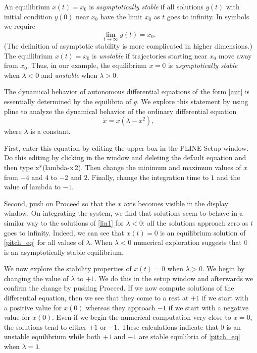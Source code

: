 \documentclass{ximera}
\begin{document}
An equilibrium $x(t)=x_0$ is {\em asymptotically stable\/}
 if all solutions $y(t)$ with
initial condition $y(0)$ near $x_0$ have the limit
$x_0$ as $t$ goes to infinity.  In symbols we require
\[
\lim_{t\to\infty} y(t) = x_0.
\]
(The definition of asymptotic stability is more complicated in
higher dimensions.) The equilibrium $x(t)=x_0$ is {\em unstable\/}
 if trajectories starting near $x_0$ move away
from $x_0$.  Thus, in
our example, the equilibrium $x=0$ is {\em asymptotically
stable\/} when $\lambda< 0$ and {\em unstable\/}
when $\lambda> 0$.

The dynamical behavior of autonomous differential equations of
the form \eqref{aut} is essentially determined by the equilibria
of $g$.  We explore this statement by using {\sf pline} to
analyze the dynamical behavior of the ordinary differential
equation
\begin{equation} \label{pitch_eq}
	\dot{x} = x(\lambda-x^2),
\end{equation}
where $\lambda$ is a constant.  

First, enter this equation by editing the upper box in the 
{\sf PLINE Setup} window.  Do this editing by clicking in 
the window and deleting the default equation and then type 
{\sf x*(lambda-x\^{$\,\!$}2)}.  Then change the minimum 
and maximum values of $x$ from $-4$ and $4$ to $-2$ and $2$.  
Finally, change the integration time to $1$ and the value
of {\sf lambda} to $-1$.  

Second,  push on {\sf Proceed} so that the $x$ axis becomes 
visible in the display window.
On integrating the system, we find that solutions seem
to behave in a similar way to the solutions of \eqref{lin1} for
$\lambda < 0$: all the solutions approach zero as $t$ goes to
infinity.  Indeed, we can see that $x(t)=0$ is an equilibrium
solution of \eqref{pitch_eq} for all values of $\lambda$.  When
$\lambda<0$ numerical exploration suggests that $0$ is an
asymptotically stable equilibrium.

We now explore the stability properties of $x(t)=0$ when
$\lambda >0$.  We begin by changing the value of $\lambda$ to
$+1$.  We do this in the setup window and afterwards we confirm
the change by pushing {\sf Proceed}.  If we now compute
solutions of the differential equation, then we see that they
come to a rest at $+1$ if we start with a positive value for
$x(0)$ whereas they approach $-1$ if we start with a negative
value for $x(0)$.  Even if we begin the numerical computation
very close to $x=0$, the solutions tend to either $+1$ or $-1$.
These calculations indicate that $0$ is an unstable equilibrium
while both $+1$ and $-1$ are stable equilibria of \eqref{pitch_eq}
when $\lambda =1$.
\end{document}
